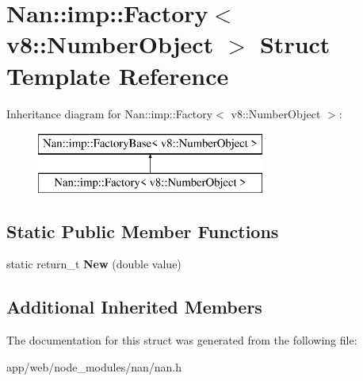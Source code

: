 \hypertarget{struct_nan_1_1imp_1_1_factory_3_01v8_1_1_number_object_01_4}{}\section{Nan\+:\+:imp\+:\+:Factory$<$ v8\+:\+:Number\+Object $>$ Struct Template Reference}
\label{struct_nan_1_1imp_1_1_factory_3_01v8_1_1_number_object_01_4}
Inheritance diagram for Nan\+:\+:imp\+:\+:Factory$<$ v8\+:\+:Number\+Object $>$\+:\begin{figure}[H]
\begin{center}
\leavevmode
\includegraphics[height=2.000000cm]{struct_nan_1_1imp_1_1_factory_3_01v8_1_1_number_object_01_4}
\end{center}
\end{figure}
\subsection*{Static Public Member Functions}
\begin{DoxyCompactItemize}
\item 
\mbox{\label{struct_nan_1_1imp_1_1_factory_3_01v8_1_1_number_object_01_4_a657b42a5ef540c2ed251463923c9e4ef}} 
static return\+\_\+t {\bfseries New} (double value)
\end{DoxyCompactItemize}
\subsection*{Additional Inherited Members}


The documentation for this struct was generated from the following file\+:\begin{DoxyCompactItemize}
\item 
app/web/node\+\_\+modules/nan/nan.\+h\end{DoxyCompactItemize}
